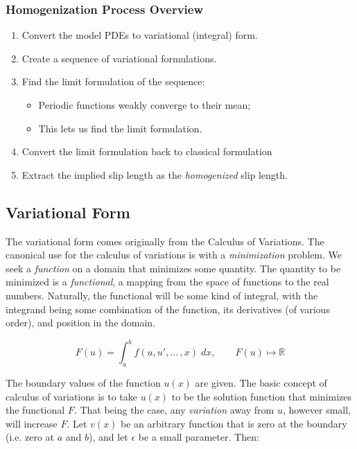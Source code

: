 \documentclass[12pt, a4paper, twoside, openright]{book}
\begin{document}
\subsubsection*{Homogenization Process Overview}

\begin{enumerate}
\item Convert the model PDEs to variational (integral) form.
\item Create a sequence of variational formulations.
\item Find the limit formulation of the sequence:
\begin{itemize}
    \item Periodic functions weakly converge to their mean;
    \item This lets us find the limit formulation.
\end{itemize}
      
\item Convert the limit formulation back to classical formulation
\item Extract the implied slip length as the \emph{homogenized} slip length.
\end{enumerate}



\subsection*{Variational Form}

The variational form comes originally from the Calculus of Variations.  The canonical use for the calculus of variations is with a \emph{minimization} problem.  We seek a \emph{function} on a domain that minimizes some quantity.  The quantity to be minimized is a \emph{functional}, a mapping from the space of functions to the real numbers.  Naturally, the functional will be some kind of integral, with the integrand being some combination of the function, its derivatives (of various order), and position in the domain.

\begin{equation}
F(u) = \int_a^b f(u,u', ...\, ,x) \; dx,  \qquad F(u) \mapsto \mathbb{R}
\end{equation} 

The boundary values of the function $u(x)$ are given.  The basic concept of calculus of variations is to take $u(x)$ to be the solution function that minimizes the functional $F$.  That being the case, any \emph{variation} away from $u$, however small, will increase $F$.  Let $v(x)$ be an arbitrary function that is zero at the boundary (i.e. zero at $a$ and $b$), and let $\epsilon$ be a small parameter. Then:
\end{document}
